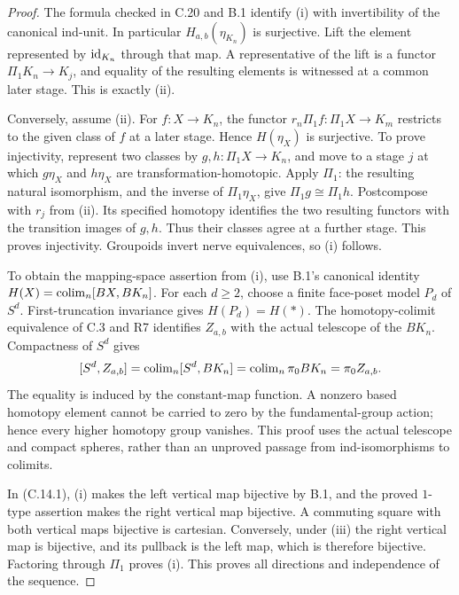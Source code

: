 \begin{proof}
The formula checked in C.20 and B.1 identify (i) with invertibility of the canonical ind-unit. In particular $H_{a,b}(\eta_{K_n})$ is surjective. Lift the element represented by $\mathrm{id}_{K_n}$ through that map. A representative of the lift is a functor $\Pi_1K_n\to K_j$, and equality of the resulting elements is witnessed at a common later stage. This is exactly (ii).

Conversely, assume (ii). For $f:X\to K_n$, the functor $r_n\Pi_1f:\Pi_1X\to K_m$ restricts to the given class of $f$ at a later stage. Hence $H(\eta_X)$ is surjective. To prove injectivity, represent two classes by $g,h:\Pi_1X\to K_n$, and move to a stage $j$ at which $g\eta_X$ and $h\eta_X$ are transformation-homotopic. Apply $\Pi_1$: the resulting natural isomorphism, and the inverse of $\Pi_1\eta_X$, give $\Pi_1g\cong\Pi_1h$. Postcompose with $r_j$ from (ii). Its specified homotopy identifies the two resulting functors with the transition images of $g,h$. Thus their classes agree at a further stage. This proves injectivity. Groupoids invert nerve equivalences, so (i) follows.

To obtain the mapping-space assertion from (i), use B.1's canonical identity $H(X)=\operatorname{colim}_n[BX,BK_n]$. For each $d\geq2$, choose a finite face-poset model $P_d$ of $S^d$. First-truncation invariance gives $H(P_d)=H(*)$. The homotopy-colimit equivalence of C.3 and R7 identifies $Z_{a,b}$ with the actual telescope of the $BK_n$. Compactness of $S^d$ gives
\[
 [S^d,Z_{a,b}]=\operatorname{colim}_n[S^d,BK_n]=\operatorname{colim}_n\pi_0BK_n=\pi_0Z_{a,b}.
\]
The equality is induced by the constant-map function. A nonzero based homotopy element cannot be carried to zero by the fundamental-group action; hence every higher homotopy group vanishes. This proof uses the actual telescope and compact spheres, rather than an unproved passage from ind-isomorphisms to colimits.

In (C.14.1), (i) makes the left vertical map bijective by B.1, and the proved $1$-type assertion makes the right vertical map bijective. A commuting square with both vertical maps bijective is cartesian. Conversely, under (iii) the right vertical map is bijective, and its pullback is the left map, which is therefore bijective. Factoring through $\Pi_1$ proves (i). This proves all directions and independence of the sequence.
\end{proof}

